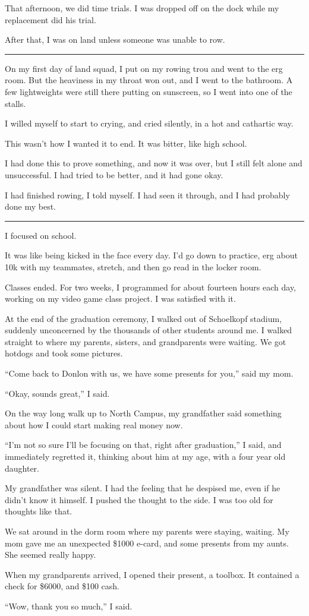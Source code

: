 That afternoon, we did time trials.  I was dropped off on the dock while my
replacement did his trial.

After that, I was on land unless someone was unable to row.

\plainfancybreak{12pt}{2}{}

On my first day of land squad, I put on my rowing trou and went to the erg room.
But the heaviness in my throat won out, and I went to the bathroom.  A few
lightweights were still there putting on sunscreen, so I went into one of the
stalls.

I willed myself to start to crying, and cried silently, in a hot and cathartic
way.

This wasn't how I wanted it to end.  It was bitter, like high school.

I had done this to prove something, and now it was over, but I still felt alone
and unsuccessful.  I had tried to be better, and it had gone okay.

I had finished rowing, I told myself.  I had seen it through, and I had probably
done my best.

\plainfancybreak{12pt}{2}{}

I focused on school.

It was like being kicked in the face every day.  I'd go down to practice, erg
about 10k with my teammates, stretch, and then go read in the locker room.

Classes ended.  For two weeks, I programmed for about fourteen hours each day,
working on my video game class project.  I was satisfied with it.

At the end of the graduation ceremony, I walked out of Schoelkopf stadium,
suddenly unconcerned by the thousands of other students around me.  I walked
straight to where my parents, sisters, and grandparents were waiting.  We got
hotdogs and took some pictures.

``Come back to Donlon with us, we have some presents for you,'' said my mom.

``Okay, sounds great,'' I said.

On the way long walk up to North Campus, my grandfather said something about how
I could start making real money now.

``I'm not so sure I'll be focusing on that, right after graduation,'' I said,
and immediately regretted it, thinking about him at my age, with a four year old
daughter.

My grandfather was silent.  I had the feeling that he despised me, even if he
didn't know it himself.  I pushed the thought to the side.  I was too old for
thoughts like that.

We sat around in the dorm room where my parents were staying, waiting.  My mom
gave me an unexpected \$1000 e-card, and some presents from my aunts.  She
seemed really happy.

When my grandparents arrived, I opened their present, a toolbox.  It contained a
check for \$6000, and \$100 cash.

``Wow, thank you so much,'' I said.
